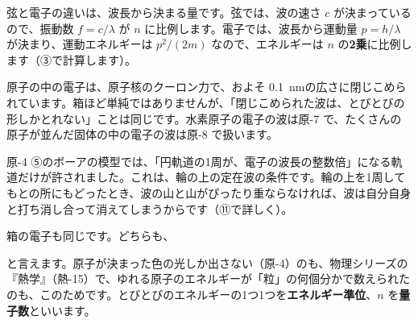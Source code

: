 \noindent 弦と電子の違いは、波長から決まる量です。弦では、波の速さ $c$ が決まっているので、振動数 $f=c/\lambda$ が $n$ に比例します。電子では、波長から運動量 $p=h/\lambda$ が決まり、運動エネルギーは $p^2/(2m)$ なので、エネルギーは $n$ の\textbf{2乗}に比例します（③で計算します）。

\begin{phmijika}
原子の中の電子は、原子核のクーロン力で、およそ \qty{0.1}{nm}の広さに閉じこめられています。箱ほど単純ではありませんが、「閉じこめられた波は、とびとびの形しかとれない」ことは同じです。水素原子の電子の波は原-7 で、たくさんの原子が並んだ固体の中の電子の波は原-8 で扱います。
\end{phmijika}

\label{ph:原-5:sec2}
原-4 ⑤のボーアの模型では、「円軌道の1周が、電子の波長の整数倍」になる軌道だけが許されました。これは、輪の上の定在波の条件です。輪の上を1周してもとの所にもどったとき、波の山と山がぴったり重ならなければ、波は自分自身と打ち消し合って消えてしまうからです（⑪で詳しく）。

\noindent 箱の電子も同じです。どちらも、
\begin{bkcenter}
\end{bkcenter}
\noindent と言えます。原子が決まった色の光しか出さない（原-4）のも、物理シリーズの『熱学』（熱-15）で、ゆれる原子のエネルギーが「粒」の何個分かで数えられたのも、このためです。とびとびのエネルギーの1つ1つを\textbf{エネルギー準位}、$n$ を\textbf{量子数}といいます。

